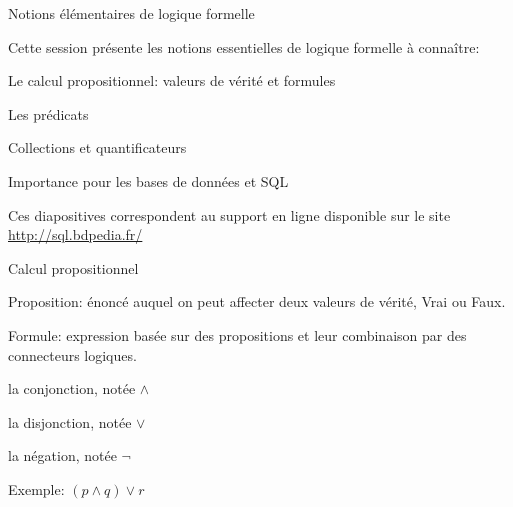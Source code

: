 
\begin{frame}[fragile]{Notions élémentaires de logique formelle}

Cette session présente les notions essentielles de logique formelle à connaître: 

\vfill

\begin{redbullet}
  \item Le calcul propositionnel: valeurs de vérité et formules
  \item Les prédicats 
  \item Collections et quantificateurs
  \item Importance pour les bases de données et SQL
\end{redbullet}

\vfill
\begin{blocgauche}
\alert{Ces diapositives correspondent au support en ligne disponible sur
le site \url{http://sql.bdpedia.fr/}}
\end{blocgauche}

\end{frame}



\begin{frame}[fragile]{Calcul propositionnel}

\alert{Proposition}: énoncé auquel on peut affecter deux valeurs de vérité, Vrai ou Faux.

\vfill

\alert{Formule}: expression basée sur des propositions et leur combinaison
par des \alert{connecteurs logiques}.


\vfill
\begin{redbullet}
   \item la conjonction, notée $\land$
   \item  la disjonction, notée $\lor$
   \item la négation, notée $\neg$
\end{redbullet}

\vfill

Exemple: $(p \land q) \lor r$
\end{frame}



